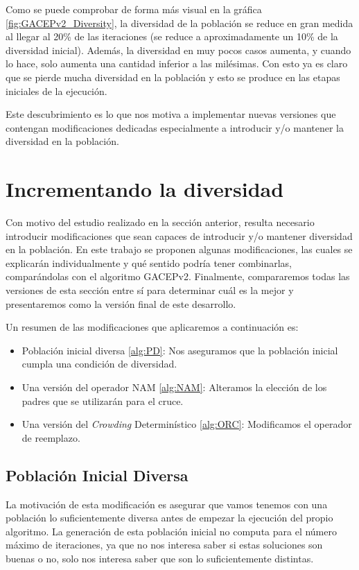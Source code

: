 Como se puede comprobar de forma más visual en la gráfica \ref{fig:GACEPv2_Diversity}, la diversidad de la población se reduce en gran medida al llegar al 20\% de las iteraciones (se reduce a aproximadamente un 10\% de la diversidad inicial). 
Además, la diversidad en muy pocos casos aumenta, y cuando lo hace, solo aumenta una cantidad inferior a las milésimas. 
Con esto ya es claro que se pierde mucha diversidad en la población y esto se produce en las etapas iniciales de la ejecución. 

Este descubrimiento es lo que nos motiva a implementar nuevas versiones que contengan modificaciones dedicadas especialmente a introducir y/o mantener la diversidad en la población. 

\section{Incrementando la diversidad}

Con motivo del estudio realizado en la sección anterior, resulta necesario introducir modificaciones que sean capaces de introducir y/o mantener diversidad en la población. 
En este trabajo se proponen algunas modificaciones, las cuales se explicarán individualmente y qué sentido podría tener combinarlas, comparándolas con el algoritmo GACEPv2. 
Finalmente, compararemos todas las versiones de esta sección entre sí para determinar cuál es la mejor y presentaremos como la versión final de este desarrollo. 

Un resumen de las modificaciones que aplicaremos a continuación es:
\begin{itemize}
	\item Población inicial diversa \ref{alg:PD}: Nos aseguramos que la población inicial cumpla una condición de diversidad. 
	\item Una versión del operador NAM \ref{alg:NAM}: Alteramos la elección de los padres que se utilizarán para el cruce.
	\item Una versión del \textit{Crowding} Determinístico \ref{alg:ORC}: Modificamos el operador de reemplazo.
\end{itemize}

\subsection{Población Inicial Diversa}

La motivación de esta modificación es asegurar que vamos tenemos con una población lo suficientemente diversa antes de empezar la ejecución del propio algoritmo. 
La generación de esta población inicial no computa para el número máximo de iteraciones, ya que no nos interesa saber si estas soluciones son buenas o no, solo nos interesa saber que son lo suficientemente distintas. 

